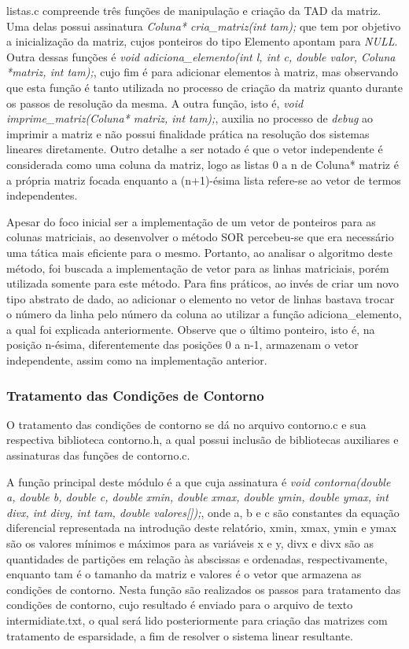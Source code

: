 \documentclass[
	article,			%
	11pt,				%
	oneside,			%
	a4paper,			%
	english,			%
	brazil,				%
	sumario=tradicional
	]{abntex2}
\begin{document}
listas.c compreende três funções de manipulação e criação da TAD da matriz. Uma delas possui assinatura \emph{Coluna* cria\_matriz(int tam);} que tem por objetivo a inicialização da matriz, cujos ponteiros do tipo Elemento apontam para \emph{NULL}. Outra dessas funções é \emph{void adiciona\_elemento(int l, int c, double valor, Coluna *matriz, int tam);}, cujo fim é para adicionar elementos à matriz, mas observando que esta função é tanto utilizada no processo de criação da matriz quanto durante os passos de resolução da mesma. A outra função, isto é, \emph{void imprime\_matriz(Coluna* matriz, int tam);}, auxilia no processo de \emph{debug} ao imprimir a matriz e não possui finalidade prática na resolução dos sistemas lineares diretamente. Outro detalhe a ser notado é que o vetor independente é considerada como uma coluna da matriz, logo as listas 0 a n de Coluna* matriz é a própria matriz focada enquanto a (n+1)-ésima lista refere-se ao vetor de termos independentes.

Apesar do foco inicial ser a implementação de um vetor de ponteiros para as colunas matriciais, ao desenvolver o método SOR percebeu-se que era necessário uma tática mais eficiente para o mesmo. Portanto, ao analisar o algoritmo deste método, foi buscada a implementação de vetor para as linhas matriciais, porém utilizada somente para este método. Para fins práticos, ao invés de criar um novo tipo abstrato de dado, ao adicionar o elemento no vetor de linhas bastava trocar o número da linha pelo número da coluna ao utilizar a função adiciona\_elemento, a qual foi explicada anteriormente. Observe que o último ponteiro, isto é, na posição n-ésima, diferentemente das posições 0 a n-1, armazenam o vetor independente, assim como na implementação anterior.

\subsubsection{Tratamento das Condições de Contorno}

O tratamento das condições de contorno se dá no arquivo contorno.c e sua respectiva biblioteca contorno.h, a qual possui inclusão de bibliotecas auxiliares e assinaturas das funções de contorno.c.

A função principal deste módulo é a que cuja assinatura é \emph{void contorna(double a, double b, double c, double xmin, double xmax, double ymin, double ymax, int divx, int divy, int tam, double valores[]);}, onde a, b e c são constantes da equação diferencial representada na introdução deste relatório, xmin, xmax, ymin e ymax são os valores mínimos e máximos para as variáveis x e y, divx e divx são as quantidades de partições em relação às abscissas e ordenadas, respectivamente, enquanto tam é o tamanho da matriz e valores é o vetor que armazena as condições de contorno. Nesta função são realizados os passos para tratamento das condições de contorno, cujo resultado é enviado para o arquivo de texto intermidiate.txt, o qual será lido posteriormente para criação das matrizes com tratamento de esparsidade, a fim de resolver o sistema linear resultante.
\end{document}
